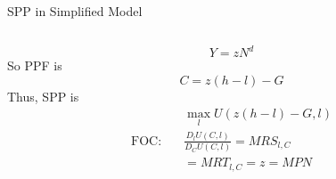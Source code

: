 \documentclass[11pt,aspectratio=43]{beamer}
\theoremstyle{definition}
\begin{document}
\begin{frame}{SPP in Simplified Model}
\begin{columns}
\begin{column}{0.5\textwidth}
            \begin{equation*}
               Y = z N^{d}
            \end{equation*}
            So PPF is
            \begin{equation*}
               C = z( h-l ) - G
            \end{equation*}
            Thus, SPP is
            \begin{align*}
                    & \max_{l} U( z( h-l ) - G, l )
                \\
                \text{FOC:} \quad
                    & \frac{D_{l}U( C, l )}{D_{C}U( C, l )} = MRS_{l, C}
                \\
                    & = MRT_{l, C} = z = MPN
            \end{align*}
        \end{column}
    \end{columns}
\end{frame}
\end{document}
